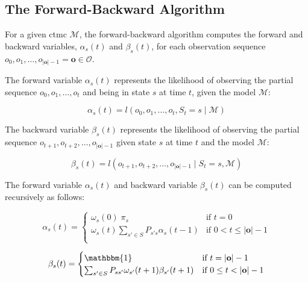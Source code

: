 \subsection{The Forward-Backward Algorithm}\label{subsec:forward-backwards_algorithm}
For a given \gls{ctmc} $\mathcal{M}$, the forward-backward algorithm computes the forward and backward variables, $\alpha_s(t)$ and $\beta_s(t)$, for each observation sequence $o_0, o_1, \dots, o_{|\mathbf{o}|-1} = \mathbf{o} \in \mathcal{O}$.

The forward variable $\alpha_s(t)$ represents the likelihood of observing the partial sequence $o_0, o_1, \dots, o_t$ and being in state $s$ at time $t$, given the model $\mathcal{M}$:


\begin{equation}
    \alpha_s(t) = l(o_0, o_1, \dots, o_t, S_{t} = s \mid \mathcal{M})
    \label{eq:alpha-recursive}
\end{equation}


The backward variable $\beta_s(t)$ represents the likelihood of observing the partial sequence $o_{t+1}, o_{t+2}, \dots, o_{|\mathbf{o}|-1}$ given state $s$ at time $t$ and the model $\mathcal{M}$:


\begin{equation}
    \beta_s(t) = l(o_{t+1}, o_{t+2}, \dots, o_{|\mathbf{o}|-1} \mid S_{t} = s, \mathcal{M})
    \label{eq:beta-recursive}
\end{equation}


The forward variable $\alpha_s(t)$ and backward variable $\beta_s(t)$ can be computed recursively as follows:


\begin{equation}
    \alpha_s(t) =
    \begin{cases}
        \omega_s(0) \; \pi_s & \text{if } t = 0 \\
        \omega_s(t) \sum_{s' \in S} P_{s's}\alpha_s(t - 1) & \text{if } 0 < t \leq |\mathbf{o}| - 1 \\
    \end{cases}
    \label{eq:forward-recursive}
\end{equation}


\begin{equation}
    \beta_s(t) =
    \begin{cases}
        \mathbbm{1} & \text{if } t = |\mathbf{o}| - 1 \\
        \sum_{s' \in S} P_{ss'} \omega_{s'}(t + 1) \beta_{s'}(t + 1) & \text{if } 0 \leq t < |\mathbf{o}| - 1 \\
    \end{cases}
    \label{eq:backward-recursive}
\end{equation}



